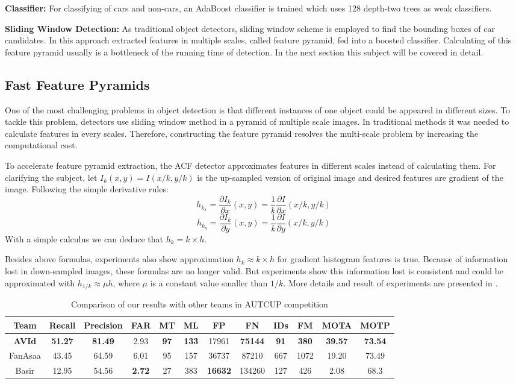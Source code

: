 \documentclass[conference]{IEEEtran}
\begin{document}
\textbf{Classifier:} For classifying of cars and non-cars, an AdaBoost classifier \cite{friedman2000additive} is trained which uses 128 depth-two trees as weak classifiers.

\textbf{Sliding Window Detection:} As traditional object detectors, sliding window scheme is employed to find the bounding boxes of car candidates. In this approach extracted features in multiple scales, called feature pyramid, fed into a boosted classifier. Calculating of this feature pyramid usually is a bottleneck of the running time of detection. In the next section this subject will be covered in detail.

\subsection{Fast Feature Pyramids}
One of the most challenging problems in object detection is that different instances of one object could be appeared in different sizes. To tackle this problem, detectors use sliding window method in a pyramid of multiple scale images. In traditional methods it was needed to calculate features in every scales. Therefore, constructing the feature pyramid  resolves the multi-scale problem by increasing the computational cost.

 To accelerate feature pyramid extraction, the ACF detector approximates features in different scales instead of calculating them. For clarifying the subject, let $I_{k}(x,y)=I(x/k,y/k)$ is the up-sampled version of original image and desired features are gradient of the image. Following the simple derivative rules:
  $$h_{k_x} = \frac{\partial I_k}{\partial x}(x,y)=\frac{1}{k}\frac{\partial I}{\partial x}(x/k,y/k)$$ $$h_{k_y} = \frac{\partial I_k}{\partial y}(x,y)=\frac{1}{k}\frac{\partial I}{\partial y}(x/k,y/k)$$ With a simple calculus we can deduce that $h_k=k\times h$.
  
Besides above formulas, experiments also show approximation $h_{k}\approx k\times h$ for gradient histogram features is true.  Because of information lost in down-sampled images, these formulas are no longer valid. But experiments show this information lost is consistent and could be approximated with $h_{1/k}\approx \mu h$, where $\mu$ is a constant value smaller than $1/k$.
More details and result of experiments are presented in \cite{dollar2014fast}.
\begin{table}[t] \label{tableResult}
	\caption{Comparison of our results with other teams in AUTCUP competition}
	\centering
	\begin{tabular}{c||ccccccccccc}
		\hline
		Team&Recall&Precision&FAR&MT&ML&FP&FN&IDs&FM&MOTA&MOTP\\
		\hline
		\textbf{AVId}&\textbf{51.27}&\textbf{81.49}&2.93&\textbf{97}&\textbf{133}&17961&\textbf{75144}&\textbf{91}&\textbf{380}&\textbf{39.57}&\textbf{73.54}\\
		FanAsaa&43.45&64.59&6.01&95&157&36737&87210&667&1072&19.20&73.49\\
		Basir&12.95&54.56&\textbf{2.72}&27&383&\textbf{16632}&134260&127&426&2.08&68.3\\
		\hline
	\end{tabular}
	
\end{table}
\end{document}
